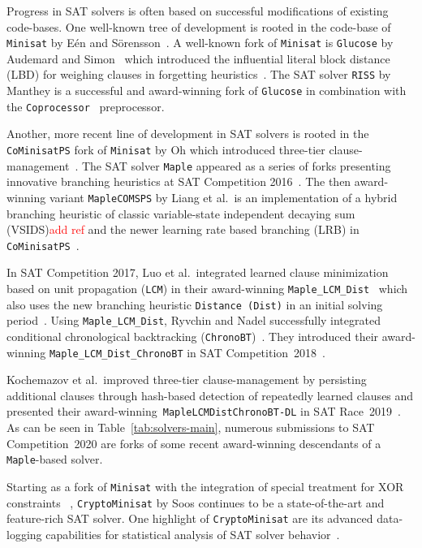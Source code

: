 \documentclass{elsarticle}
\newcommand{\solver}[1]{\texttt{#1}}
\begin{document}
Progress in SAT solvers is often based on successful modifications of existing code-bases. 
One well-known tree of development is rooted in the code-base of \solver{Minisat} by E\'en and S\"orensson~\cite{Niklas:2003:Minisat}. 
A well-known fork of \solver{Minisat} is \solver{Glucose} by Audemard and Simon~\cite{Audemard:2018:Glucose} which introduced the influential literal block distance (LBD) for weighing clauses in forgetting heuristics~\cite{Audemard:2009:Glucose}. 
The SAT solver \solver{RISS} by Manthey is a successful and award-winning fork of \solver{Glucose} in combination with the \solver{Coprocessor}~\cite{Manthey:2012:Coprocessor2} preprocessor. 

Another, more recent line of development in SAT solvers
is rooted in the \solver{CoMinisatPS} fork of \solver{Minisat} by Oh which introduced three-tier clause-management~\cite{Oh:2015:satunsat}. 
The SAT solver \solver{Maple} appeared as a series of forks presenting innovative branching heuristics at SAT Competition 2016~\cite{Liang:2016:LRB}. 
The then award-winning variant \solver{MapleCOMSPS} by Liang et al.~is an implementation of a hybrid branching heuristic of classic variable-state independent decaying sum (VSIDS)\textcolor{red}{add ref} and the newer learning rate based branching (LRB) in \solver{CoMinisatPS}~\cite{Liang:2016:MapleCOMSPS}. 

In SAT Competition 2017, Luo et al.~integrated learned clause minimization based on unit propagation (\solver{LCM}) in their award-winning \solver{Maple\_LCM\_Dist}~\cite{Luo:2017:LCM} which also uses the new branching heuristic \solver{Distance (Dist)} in an initial solving period~\cite{Xiao:2017:MapleLCMDist}. 
Using \solver{Maple\_LCM\_Dist}, Ryvchin and Nadel successfully integrated conditional chronological backtracking (\solver{ChronoBT})~\cite{Nadel:2018:CBT}. 
They introduced their award-winning \solver{Maple\_LCM\_Dist\_ChronoBT} in SAT Competition~2018~\cite{Ryvchin:SC2018:MapleChronoBT}. 

Kochemazov et al.~improved three-tier clause-management by persisting
additional clauses through hash-based detection of repeatedly learned clauses and presented their award-winning~\solver{MapleLCMDistChronoBT-DL} in SAT Race~2019~\cite{Kochemazov:SC2019:MapleChronoBTDL}. 
As can be seen in Table~\ref{tab:solvers-main}, numerous submissions to SAT Competition~2020 are forks of some recent award-winning descendants of a \solver{Maple}-based solver. 

Starting as a fork of \solver{Minisat} with the integration of special treatment for XOR constraints ~\cite{Soos:2009:Crypto},
\solver{CryptoMinisat} by Soos continues to be a state-of-the-art and feature-rich SAT solver. 
One highlight of \solver{CryptoMinisat} are its advanced data-logging capabilities for statistical analysis of SAT solver behavior~\cite{Soos:2019:ChrystalBall}.
\end{document}
